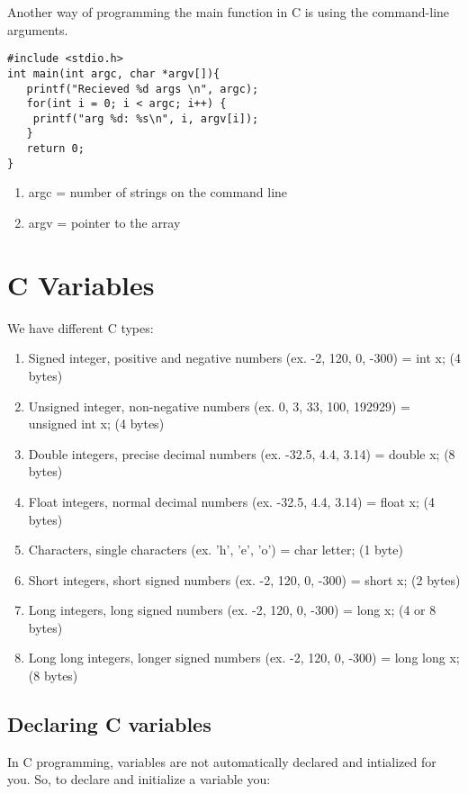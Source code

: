 \documentclass{article}
\begin{document}
Another way of programming the main function in C is using the command-line arguments. \\

\begin{verbatim}
#include <stdio.h>
int main(int argc, char *argv[]){
   printf("Recieved %d args \n", argc);
   for(int i = 0; i < argc; i++) {
	printf("arg %d: %s\n", i, argv[i]);
   }
   return 0;
}
\end{verbatim}

\begin{enumerate}
\item argc = number of strings on the command line
\item argv = pointer to the array
\end{enumerate} 

\section{C Variables}
We have different C types:

\begin{enumerate}
\item Signed integer, positive and negative numbers (ex. -2, 120, 0, -300) = int x; (4 bytes)
\item Unsigned integer, non-negative numbers (ex. 0, 3, 33, 100, 192929) = unsigned int x; (4 bytes)
\item Double integers, precise decimal numbers (ex. -32.5, 4.4, 3.14) = double x; (8 bytes)
\item Float integers, normal decimal numbers (ex. -32.5, 4.4, 3.14) = float x; (4 bytes)
\item Characters, single characters (ex. 'h', 'e', 'o') = char letter; (1 byte)
\item Short integers, short signed numbers (ex. -2, 120, 0, -300) = short x; (2 bytes)
\item Long integers, long signed numbers (ex. -2, 120, 0, -300) = long x; (4 or 8 bytes)
\item Long long integers, longer signed numbers (ex. -2, 120, 0, -300) = long long x; (8 bytes)
\end{enumerate}


\subsection*{Declaring C variables}
In C programming, variables are not automatically declared and intialized for you. So, to declare and initialize a variable you: 
\end{document}
